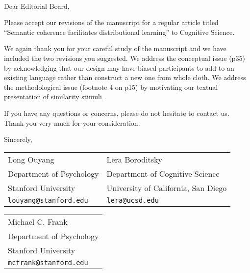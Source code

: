 \documentclass{letter}
\begin{document}
\address{450 Serra Mall \\ Building 420 (Jordan Hall) \\ Stanford, CA~~94305}


\pagestyle{empty}
\begin{letter}{~~~}
\opening{Dear Editorial Board,}

Please accept our revisions of the manuscript for a regular article titled ``Semantic coherence facilitates distributional learning'' to Cognitive Science.

We again thank you for your careful study of the manuscript and we have included the two revisions you suggested.
We address the conceptual issue (p35) by acknowledging that our design may have biased participants to add to an existing language rather than construct a new one from whole cloth.
We address the methodological issue (footnote 4 on p15) by motivating our textual presentation of similarity stimuli .



If you have any questions or concerns, please do not hesitate to contact us. Thank you very much for your consideration.


\vspace{2\parskip}
Sincerely,\\

\begin{tabularx}{\textwidth}{X l}
Long Ouyang & Lera Boroditsky\\
Department of Psychology & Department of Cognitive Science\\
Stanford University & University of California, San Diego\\
\texttt{louyang@stanford.edu} & \texttt{lera@ucsd.edu}\\
\end{tabularx}

\begin{tabular}{l}
Michael C. Frank\\
Department of Psychology\\
Stanford University\\
\texttt{mcfrank@stanford.edu}
\end{tabular}

\end{letter}
\end{document}
